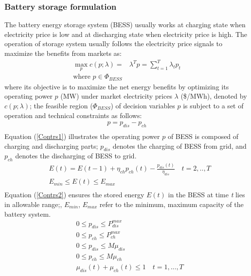 \documentclass[journal]{IEEEtran}
\begin{document}
\subsubsection{Battery storage formulation}
The battery energy storage system (BESS) usually works at charging state when electricity price is low and at discharging state when electricity price is high. The operation of storage system usually follows the electricity price signals to maximize the benefits from markets as:
\begin{equation}
  \label{ESbigM}
  \begin{aligned}
    \max_{p} c(p; \lambda) = &\lambda^T p = \sum_{t=1}^T \lambda_t p_t \\
    \text{where }  p \in \Phi_{BESS}
  \end{aligned}
\end{equation}
where its objective is to maximize the net energy benefits by optimizing its operating power $p$ (MW) under market electricity prices $\lambda$ (\$/MWh), denoted by $c(p; \lambda)$; the feasible region ($\Phi_{BESS}$) of decision variables $p$ is subject to a set of operation and technical constraints as follows:
\begin{equation}
  \label{Contrs1}
  \begin{aligned}
    p = p_{dis} - p_{ch} \\
  \end{aligned}
\end{equation}
Equation (\ref{Contrs1}) illustrates the operating power $p$ of BESS is composed of charging and discharging parts; $p_{dis}$ denotes the charging of BESS from grid, and $p_{ch}$ denotes the discharging of BESS to grid.
\begin{equation}
  \label{Contrs2}
  \begin{aligned}
    &E(t) = E(t-1) + \eta_{ch} p_{ch}(t) - \frac{p_{dis}(t)}{\eta_{dis}} \quad t=2,..,T\\
    &E_{min} \leq E(t) \leq E_{max} \\
  \end{aligned}
\end{equation}
Equation (\ref{Contrs2}) ensures the stored energy $E(t)$ in the BESS at time \textit{t} lies in allowable range;, $E_{min}$, $E_{max}$ refer to the minimum, maximum capacity of the battery system.
\begin{equation}
  \label{Contrs3}
  \begin{aligned}
    & 0 \leq p_{dis} \leq P_{dis}^{max} \\
    & 0 \leq p_{ch} \leq P_{ch}^{max}  \\
    & 0 \leq p_{dis} \leq M \mu_{dis}   \\
    & 0 \leq p_{ch} \leq M \mu_{ch}     \\
    & \mu_{dis}(t) + \mu_{ch}(t) \leq 1 \quad t=1,...,T\\
  \end{aligned}
\end{equation}
\end{document}
